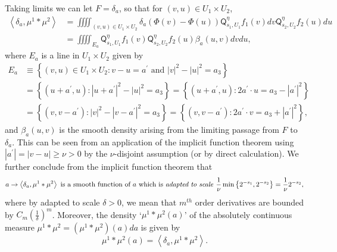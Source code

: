 \documentclass{amsart}%
\theoremstyle{plain}
\numberwithin{equation}{section}
\begin{document}
Taking limits we can let $F=\delta_{a}$, so that for $\left(  v,u\right)  \in
U_{1}\times U_{2}$,%
\begin{align}
\left\langle \delta_{a},\mu^{1}\ast\mu^{2}\right\rangle  &  =\iiiint_{\left(
v,u\right)  \in U_{1}\times U_{2}}\delta_{a}\left(  \Phi\left(  v\right)
-\Phi\left(  u\right)  \right)  \mathsf{Q}_{s_{1},U_{1}}^{\eta}f_{1}\left(
v\right)  dv\mathsf{Q}_{s_{2},U_{2}}^{\eta}f_{2}\left(  u\right)
du\label{beta}\\
&  =\iiiint_{E_{a}}\mathsf{Q}_{s_{1},U_{1}}^{\eta}f_{1}\left(  v\right)
\mathsf{Q}_{s_{2},U_{2}}^{\eta}f_{2}\left(  u\right)  \beta_{a}\left(
u,v\right)  dvdu,\nonumber
\end{align}
where $E_{a}$ is a line in $U_{1}\times U_{2}$ given by%
\begin{align*}
E_{a}  &  \equiv\left\{  \left(  v,u\right)  \in U_{1}\times U_{2}%
:v-u=a^{\prime}\text{ and }\left\vert v\right\vert ^{2}-\left\vert
u\right\vert ^{2}=a_{3}\right\} \\
&  =\left\{  \left(  u+a^{\prime},u\right)  :\left\vert u+a^{\prime
}\right\vert ^{2}-\left\vert u\right\vert ^{2}=a_{3}\right\}  =\left\{
\left(  u+a^{\prime},u\right)  :2a^{\prime}\cdot u=a_{3}-\left\vert a^{\prime
}\right\vert ^{2}\right\} \\
&  =\left\{  \left(  v,v-a^{\prime}\right)  :\left\vert v\right\vert
^{2}-\left\vert v-a^{\prime}\right\vert ^{2}=a_{3}\right\}  =\left\{  \left(
v,v-a^{\prime}\right)  :2a^{\prime}\cdot v=a_{3}+\left\vert a^{\prime
}\right\vert ^{2}\right\}  ,
\end{align*}
and $\beta_{a}\left(  u,v\right)  $ is the smooth density arising from the
limiting passage from $F$ to $\delta_{a}$. This can be seen from an
application of the implicit function theorem using $\left\vert a^{\prime
}\right\vert =\left\vert v-u\right\vert \geq\nu>0$ by the $\nu$-disjoint
assumption (or by direct calculation). We further conclude from the implicit
function theorem that%
\begin{equation}
a\rightarrow\left\langle \delta_{a},\mu^{1}\ast\mu^{2}\right\rangle \text{ is
a smooth function of }a\text{ which is \emph{adapted to scale }}\frac{1}{\nu
}\min\left\{  2^{-s_{1}},2^{-s_{2}}\right\}  =\frac{1}{\nu}2^{-s_{2}%
},\label{ift adapted}%
\end{equation}
where by adapted to scale $\delta>0$, we mean that $m^{th}$ order derivatives
are bounded by $C_{m}\left(  \frac{1}{\delta}\right)  ^{m}$. Moreover, the
density `$\mu^{1}\ast\mu^{2}\left(  a\right)  $' of the absolutely continuous
measure $\mu^{1}\ast\mu^{2}=\left(  \mu^{1}\ast\mu^{2}\right)  \left(
a\right)  da$ is given by%
\begin{equation}
\mu^{1}\ast\mu^{2}\left(  a\right)  =\left\langle \delta_{a},\mu^{1}\ast
\mu^{2}\right\rangle .\label{density}%
\end{equation}
\end{document}
